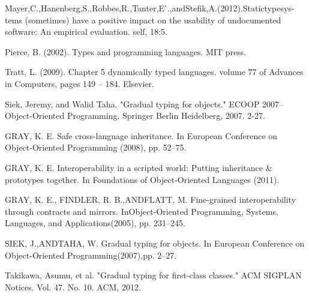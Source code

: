 \documentclass[preprint]{sigplanconf}
\begin{document}
\begin{thebibliography}{}
Mayer,C.,Hanenberg,S.,Robbes,R.,Tanter,E ́.,andStefik,A.(2012).Statictypesys- tems (sometimes) have a positive impact on the usability of undocumented software: An empirical evaluation. self, 18:5.

Pierce, B. (2002). Types and programming languages. MIT press.

Tratt, L. (2009). Chapter 5 dynamically typed languages. volume 77 of Advances in Computers, pages 149 – 184. Elsevier.

Siek, Jeremy, and Walid Taha. "Gradual typing for objects." ECOOP 2007–Object-Oriented Programming. Springer Berlin Heidelberg, 2007. 2-27.

GRAY, K. E. Safe cross-language inheritance. In European Conference on Object-Oriented Programming (2008), pp. 52–75.

GRAY, K. E. Interoperability in a scripted world: Putting inheritance \& prototypes together. In Foundations of Object-Oriented Languages (2011).

GRAY, K. E., FINDLER, R. B.,ANDFLATT, M. Fine-grained interoperability through contracts and mirrors. InObject-Oriented Programming, Systems, Languages, and Applications(2005), pp. 231–245.

SIEK, J.,ANDTAHA, W. Gradual typing for objects. In European Conference on Object-Oriented Programming(2007),pp. 2–27.

Takikawa, Asumu, et al. "Gradual typing for first-class classes." ACM SIGPLAN Notices. Vol. 47. No. 10. ACM, 2012.

\end{thebibliography}
\end{document}
